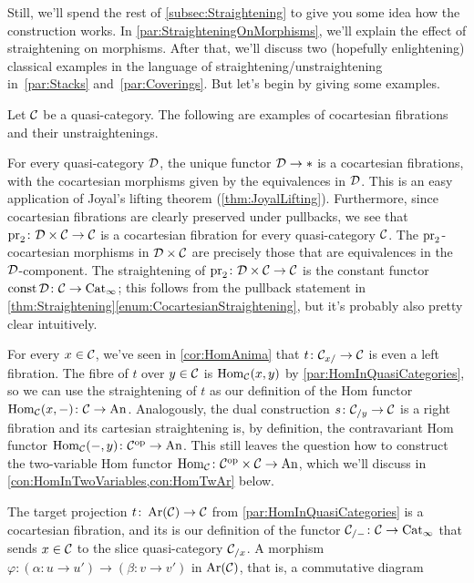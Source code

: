 Still, we'll spend the rest of \cref{subsec:Straightening} to give you some idea how the construction works. In \cref{par:StraighteningOnMorphisms}, we'll explain the effect of straightening on morphisms. After that, we'll discuss two (hopefully enlightening) classical examples in the language of straightening/unstraightening in~\cref{par:Stacks} and~\cref{par:Coverings}. But let's begin by giving some examples.
\begin{exm}\label{exm:Straightening}
	Let $\mathcal{C}$ be a quasi-category. The following are examples of cocartesian fibrations and their unstraightenings.
	\begin{alphanumerate}
		\item For every quasi-category $\mathcal{D}$, the unique functor $\mathcal{D}\rightarrow *$ is a cocartesian fibrations, with the cocartesian morphisms given by the equivalences in $\mathcal{D}$. This is an easy application of Joyal's lifting theorem (\cref{thm:JoyalLifting}). Furthermore, since cocartesian fibrations are clearly preserved under pullbacks, we see that $\operatorname{pr}_2\colon \mathcal{D}\times \mathcal{C}\rightarrow\mathcal{C}$ is a cocartesian fibration for every quasi-category $\mathcal{C}$. The $\operatorname{pr}_2$-cocartesian morphisms in $\mathcal{D}\times\mathcal{C}$ are precisely those that are equivalences in the $\mathcal{D}$-component. The straightening of $\operatorname{pr}_2\colon \mathcal{D}\times \mathcal{C}\rightarrow\mathcal{C}$ is the constant functor $\operatorname{const} \mathcal{D}\colon \mathcal{C}\rightarrow \mathrm{Cat}_\infty$; this follows from the pullback statement in \cref{thm:Straightening}\cref{enum:CocartesianStraightening}, but it's probably also pretty clear intuitively.\label{enum:ProjectionsStraightenToConstantFunctors}
		\item For every $x\in \mathcal{C}$, we've seen in \cref{cor:HomAnima} that $t\colon \mathcal{C}_{x/}\rightarrow \mathcal{C}$ is even a left fibration. The fibre of $t$ over $y\in\mathcal{C}$ is $\operatorname{Hom}_{\mathcal{C}}(x,y)$ by \cref{par:HomInQuasiCategories}, so we can use the straightening of $t$ as our definition of the Hom functor $\operatorname{Hom}_{\mathcal{C}}(x,-)\colon \mathcal{C}\rightarrow \mathrm{An}$. Analogously, the dual construction $s\colon \mathcal{C}_{/y}\rightarrow \mathcal{C}$ is a right fibration and its cartesian straightening is, by definition, the contravariant Hom functor $\operatorname{Hom}_{\mathcal{C}}(-,y)\colon \mathcal{C}^{\mathrm{op}}\rightarrow \mathrm{An}$. This still leaves the question how to construct the two-variable Hom functor $\operatorname{Hom}_{\mathcal{C}}\colon \mathcal{C}^{\mathrm{op}}\times\mathcal{C}\rightarrow\mathrm{An}$, which we'll discuss in \cref{con:HomInTwoVariables,con:HomTwAr} below.\label{enum:SliceLeftFibration}
		\item The target projection $t\colon \operatorname{Ar}(\mathcal{C})\rightarrow \mathcal{C}$ from \cref{par:HomInQuasiCategories} is a cocartesian fibration, and its is our definition of the functor $\mathcal{C}_{/-}\colon \mathcal{C}\rightarrow\mathrm{Cat}_\infty$ that sends $x\in\mathcal{C}$ to the slice quasi-category $\mathcal{C}_{/x}$. A morphism $\varphi\colon (\alpha\colon u\rightarrow u')\rightarrow (\beta\colon v\rightarrow v')$ in $\operatorname{Ar}(\mathcal{C})$, that is, a commutative diagram\label{enum:ArCocartesianFibration}

\end{alphanumerate}
\end{exm}
